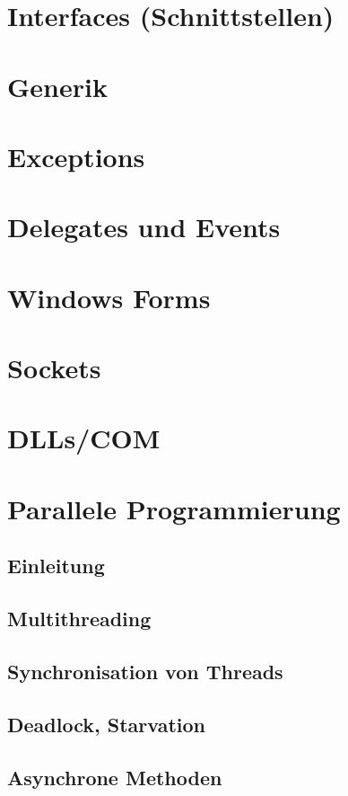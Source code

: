 \documentclass{scrreprt}
\begin{document}
\chapter{Interfaces (Schnittstellen)}


\chapter{Generik}


\chapter{Exceptions}


\chapter{Delegates und Events}


\chapter{Windows Forms}



\chapter{Sockets}


\chapter{DLLs/COM}


\chapter{Parallele Programmierung}
\section{Einleitung}

\section{Multithreading}

\section{Synchronisation von Threads}

\section{Deadlock, Starvation}

\section{Asynchrone Methoden}

\end{document}
